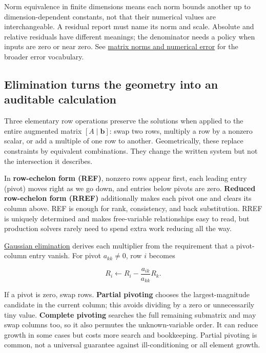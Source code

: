 Norm equivalence in finite dimensions means each norm bounds another up to dimension-dependent constants, not that their numerical values are interchangeable. A residual report must name its norm and scale. Absolute and relative residuals have different meanings; the denominator needs a policy when inputs are zero or near zero. See \hyperref[01-foundations-i-ch019-matrix-norms-put-scale-into-error-statements]{matrix norms and numerical error} for the broader error vocabulary.

\subsection{Elimination turns the geometry into an auditable calculation}\label{01-foundations-i-ch019-elimination-turns-the-geometry-into-an-auditable-calculation}

Three elementary row operations preserve the solutions when applied to the entire augmented matrix \([A\mid\mathbf b]\): swap two rows, multiply a row by a nonzero scalar, or add a multiple of one row to another. Geometrically, these replace constraints by equivalent combinations. They change the written system but not the intersection it describes.

In \textbf{row-echelon form (REF)}, nonzero rows appear first, each leading entry (pivot) moves right as we go down, and entries below pivots are zero. \textbf{Reduced row-echelon form (RREF)} additionally makes each pivot one and clears its column above. REF is enough for rank, consistency, and back substitution. RREF is uniquely determined and makes free-variable relationships easy to read, but production solvers rarely need to spend extra work reducing all the way.

\hyperref[01-foundations-i-ch019-elimination-turns-the-geometry-into-an-auditable-calculation]{Gaussian elimination} derives each multiplier from the requirement that a pivot-column entry vanish. For pivot \(a_{kk}\ne0\), row \(i\) becomes

\[
R_i\leftarrow R_i-\frac{a_{ik}}{a_{kk}}R_k.
\]

If a pivot is zero, swap rows. \textbf{Partial pivoting} chooses the largest-magnitude candidate in the current column; this avoids dividing by a zero or unnecessarily tiny value. \textbf{Complete pivoting} searches the full remaining submatrix and may swap columns too, so it also permutes the unknown-variable order. It can reduce growth in some cases but costs more search and bookkeeping. Partial pivoting is common, not a universal guarantee against ill-conditioning or all element growth.

